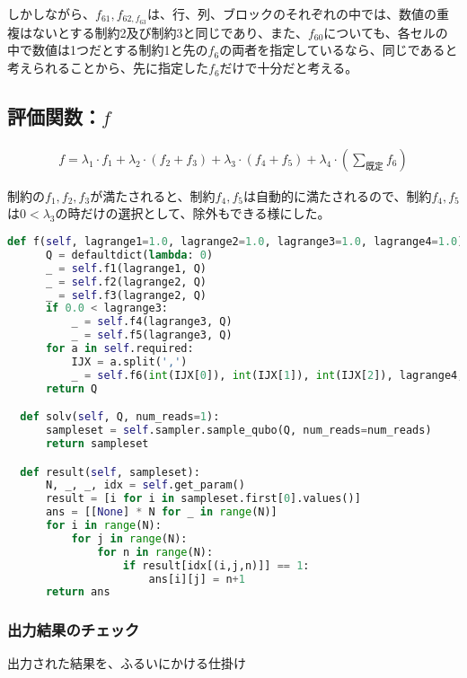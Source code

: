 \documentclass[uplatex,dvipdfmx,a4paper,11pt,oneside,openany]{jsbook}
\begin{document}
しかしながら、$f_{61}, f_{62, f_{63}}$は、行、列、ブロックのそれぞれの中では、数値の重複はないとする制約2及び制約3と同じであり、また、$f_{60}$についても、各セルの中で数値は1つだとする制約1と先の$f_6$の両者を指定しているなら、同じであると考えられることから、先に指定した$f_6$だけで十分だと考える。

\subsection{評価関数：$f$}

\begin{eqnarray*}
  f = \lambda_1\cdot f_1 + \lambda_2\cdot(f_2 + f_3) + \lambda_3\cdot(f_4 + f_5) + \lambda_4\cdot (\sum_{既定}f_6)
\end{eqnarray*}

制約の$f_1, f_2, f_3$が満たされると、制約$f_4, f_5$は自動的に満たされるので、制約$f_4, f_5$は$0<\lambda_3$の時だけの選択として、除外もできる様にした。

\begin{lstlisting}[language=Python]
    def f(self, lagrange1=1.0, lagrange2=1.0, lagrange3=1.0, lagrange4=1.0):
      Q = defaultdict(lambda: 0)
      _ = self.f1(lagrange1, Q)
      _ = self.f2(lagrange2, Q)
      _ = self.f3(lagrange2, Q)
      if 0.0 < lagrange3:
          _ = self.f4(lagrange3, Q)
          _ = self.f5(lagrange3, Q)
      for a in self.required:
          IJX = a.split(',')
          _ = self.f6(int(IJX[0]), int(IJX[1]), int(IJX[2]), lagrange4, Q)
      return Q

  def solv(self, Q, num_reads=1):
      sampleset = self.sampler.sample_qubo(Q, num_reads=num_reads)
      return sampleset

  def result(self, sampleset):
      N, _, _, idx = self.get_param()
      result = [i for i in sampleset.first[0].values()]
      ans = [[None] * N for _ in range(N)]
      for i in range(N):
          for j in range(N):
              for n in range(N):
                  if result[idx[(i,j,n)]] == 1:
                      ans[i][j] = n+1
      return ans
\end{lstlisting}

\subsubsection{出力結果のチェック}

出力された結果を、ふるいにかける仕掛け
\end{document}

